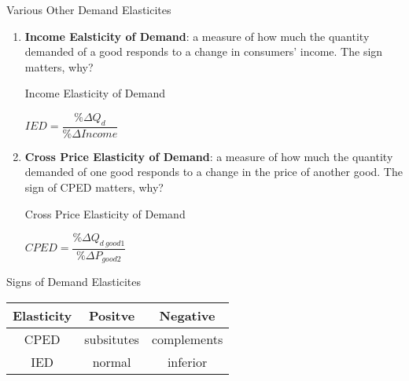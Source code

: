 \documentclass[aspectratio=169]{beamer}
\begin{document}
\begin{frame}{Various Other Demand Elasticites}
    \begin{enumerate}
        \item<1-> \textbf{Income Ealsticity of Demand}: a measure of how much the quantity demanded
        of a good responds to a change in consumers’ income. The sign matters, why?
        \begin{block}{Income Elasticity of Demand}
        \begin{center}
            $ IED = \dfrac{\%\Delta Q_d}{\% \Delta Income } $
        \end{center}
        \end{block}
    
        \item<3->\textbf{Cross Price Elasticity of Demand}: a measure of how much the quantity demanded of one good responds to
        a change in the price of another good. The sign of CPED matters, why?
        \begin{block}{Cross Price Elasticity of Demand}
            \begin{center}
                $ CPED = \dfrac{\% \Delta Q_{d~good1}}{\% \Delta P_{good2}}  $
            \end{center}    
        \end{block}
    \end{enumerate}
\end{frame}

\begin{frame}{Signs of Demand Elasticites}
    \begin{center}
        \begin{tabular}[c]{|c|c|c|}
            \hline
            Elasticity & Positve & Negative \\
            \hline
            CPED & subsitutes & complements \\
            \hline
            IED &  normal & inferior \\
            \hline

       \end{tabular}
    \end{center}
\end{frame}
\end{document}
